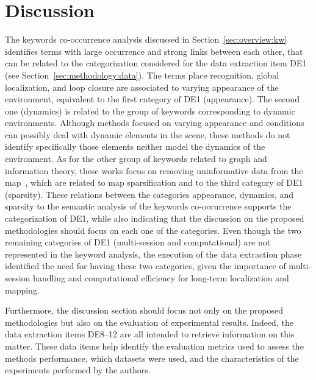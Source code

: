 \section{Discussion}
\label{sec:discussion}

The keywords co-occurrence analysis discussed in Section~\ref{sec:overview:kw} identifies terms with large occurrence and strong links between each other, that can be related to the categorization considered for the data extraction item DE1 (see Section~\ref{sec:methodology:data}).
The terms place recognition, global localization, and loop closure are associated to varying appearance of the environment, equivalent to the first category of DE1 (appearance).
The second one (dynamics) is related to the group of keywords corresponding to dynamic environments. Although methods focused on varying appearance and conditions can possibly deal with dynamic elements in the scene, these methods do not identify specifically those elements neither model the dynamics of the environment.
As for the other group of keywords related to graph and information theory, these works focus on removing uninformative data from the map~\parencite{kretzschmar-stachniss:2012:0278364912455072}, which are related to map sparsification and to the third category of DE1 (sparsity).
These relations between the categories appearance, dynamics, and sparsity to the semantic analysis of the keywords co-occurrence supports the categorization of DE1, while also indicating that the discussion on the proposed methodologies should focus on each one of the categories.
Even though the two remaining categories of DE1 (multi-session and computational) are not represented in the keyword analysis, the execution of the data extraction phase identified the need for having these two categories, given the importance of multi-session handling and computational efficiency for long-term localization and mapping.

Furthermore, the discussion section should focus not only on the proposed methodologies but also on the evaluation of experimental results. Indeed, the data extraction items DE8--12 are all intended to retrieve information on this matter.
These data items help identify the evaluation metrics used to assess the methods performance, which datasets were used, and the characteristics of the experiments performed by the authors.

